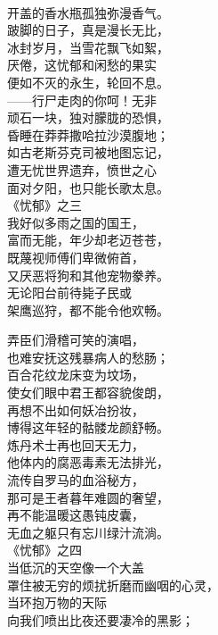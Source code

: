 \documentclass{article}
\begin{document}
\\
开盖的香水瓶孤独弥漫香气。 \\ 


跛脚的日子，真是漫长无比，\\
冰封岁月，当雪花飘飞如絮，\\
厌倦，这忧郁和闲愁的果实\\
便如不灭的永生，轮回不息。\\
——行尸走肉的你呵！无非\\
顽石一块，独对朦胧的恐惧，\\
昏睡在莽莽撒哈拉沙漠腹地；\\
如古老斯芬克司被地图忘记，\\
遭无忧世界遗弃，愤世之心
\\
面对夕阳，也只能长歌太息。 \\ 


《忧郁》之三 \\ 


我好似多雨之国的国王，\\
富而无能，年少却老迈苍苍，\\
既蔑视师傅们卑微俯首，\\
又厌恶将狗和其他宠物豢养。\\
无论阳台前待毙子民或\\
架鹰巡狩，都不能令他欢畅。\\
\newpage

弄臣们滑稽可笑的演唱，\\
也难安抚这残暴病人的愁肠；\\
百合花纹龙床变为坟场，\\
使女们眼中君王都容貌俊朗，\\
再想不出如何妖冶扮妆，\\
博得这年轻的骷髅龙颜舒畅。\\
炼丹术士再也回天无力，\\
他体内的腐恶毒素无法排光，\\
流传自罗马的血浴秘方，\\
那可是王者暮年难圆的奢望，\\
再不能温暖这愚钝皮囊，
\\
无血之躯只有忘川绿汁流淌。 \\ 


《忧郁》之四 \\ 


当低沉的天空像一个大盖\\
罩住被无穷的烦扰折磨而幽咽的心灵，\\
当环抱万物的天际
\\
向我们喷出比夜还要凄冷的黑影； \\ 
\end{document}
